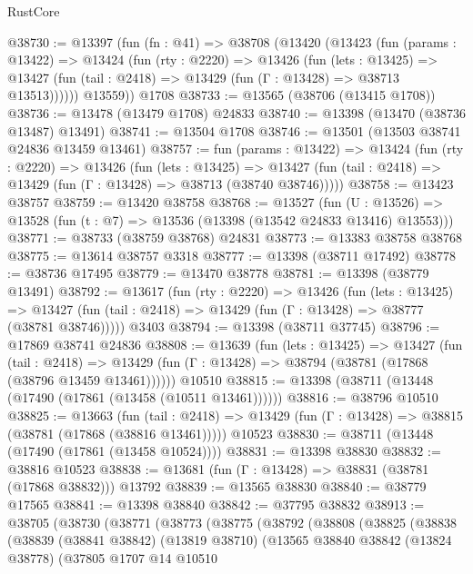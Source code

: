 \begin{lexlean}{RustCore}
\begin{coremodule}
@38730 := @13397
    (fun (fn : @41) =>
    @38708
      (@13420
        (@13423
          (fun (params : @13422) =>
          @13424
            (fun (rty : @2220) =>
            @13426
              (fun (lets : @13425) =>
              @13427 (fun (tail : @2418) => @13429 (fun (Γ : @13428) => @38713 @13513))))))
        @13559))
    @1708
@38733 := @13565 (@38706 (@13415 @1708))
@38736 := @13478 (@13479 @1708) @24833
@38740 := @13398 (@13470 (@38736 @13487) @13491)
@38741 := @13504 @1708
@38746 := @13501 (@13503 @38741 @24836 @13459 @13461)
@38757 := fun (params : @13422) =>
  @13424
    (fun (rty : @2220) =>
    @13426
      (fun (lets : @13425) =>
      @13427 (fun (tail : @2418) => @13429 (fun (Γ : @13428) => @38713 (@38740 @38746)))))
@38758 := @13423 @38757
@38759 := @13420 @38758
@38768 := @13527
    (fun (U : @13526) => @13528 (fun (t : @7) => @13536 (@13398 (@13542 @24833 @13416) @13553)))
@38771 := @38733 (@38759 @38768) @24831
@38773 := @13383 @38758 @38768
@38775 := @13614 @38757 @3318
@38777 := @13398 (@38711 @17492)
@38778 := @38736 @17495
@38779 := @13470 @38778
@38781 := @13398 (@38779 @13491)
@38792 := @13617
    (fun (rty : @2220) =>
    @13426
      (fun (lets : @13425) =>
      @13427 (fun (tail : @2418) => @13429 (fun (Γ : @13428) => @38777 (@38781 @38746)))))
    @3403
@38794 := @13398 (@38711 @37745)
@38796 := @17869 @38741 @24836
@38808 := @13639
    (fun (lets : @13425) =>
    @13427
      (fun (tail : @2418) =>
      @13429 (fun (Γ : @13428) => @38794 (@38781 (@17868 (@38796 @13459 @13461))))))
    @10510
@38815 := @13398 (@38711 (@13448 (@17490 (@17861 (@13458 (@10511 @13461))))))
@38816 := @38796 @10510
@38825 := @13663
    (fun (tail : @2418) => @13429 (fun (Γ : @13428) => @38815 (@38781 (@17868 (@38816 @13461)))))
    @10523
@38830 := @38711 (@13448 (@17490 (@17861 (@13458 @10524))))
@38831 := @13398 @38830
@38832 := @38816 @10523
@38838 := @13681 (fun (Γ : @13428) => @38831 (@38781 (@17868 @38832))) @13792
@38839 := @13565 @38830
@38840 := @38779 @17565
@38841 := @13398 @38840
@38842 := @37795 @38832
@38913 := @38705
    (@38730
      (@38771
        (@38773
          (@38775
            (@38792
              (@38808
                (@38825
                  (@38838
                    (@38839
                      (@38841 @38842)
                      (@13819 @38710)
                      (@13565
                        @38840
                        @38842
                        (@13824 @38778)
                        (@37805
                          @1707
                          @14
                          @10510

\end{coremodule}
\end{lexlean}
